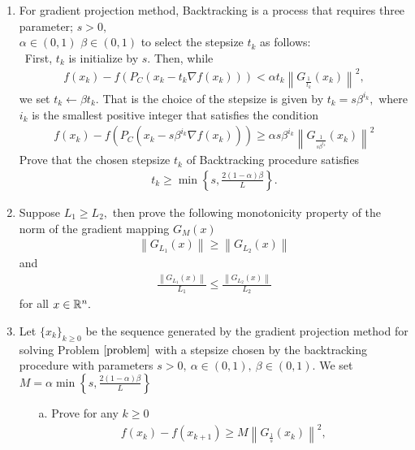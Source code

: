 \documentclass{ExerciseSheet}
\begin{document}
\begin{problem}
\begin{enumerate}
        \item For gradient projection method, Backtracking is a process that requires three parameter; $s>0,$\\ $\alpha\in(0,1)$
        $\beta\in(0,1)$ to select the stepsize $t_k$ as follows:\\
        \ First, $t_k$ is initialize by $s.$ Then, while
            \begin{align*}
                f(x_k) - f\left(P_C(x_k -t_k\nabla f(x_k))\right) < \alpha t_k \left\| G_{\frac{1}{t_k}}(x_k)\right\|^2,
            \end{align*}
            we set $t_k\leftarrow \beta t_k.$ That is the choice of the stepsize is given by $t_k=s\beta^{i_k},$ where $i_k$ is the smallest positive integer that satisfies the condition
            \begin{align}\label{backtracking}
                f(x_k) - f\left(P_C(x_k -s\beta^{i_k}\nabla f(x_k))\right) \geq \alpha s\beta^{i_k}\left\| G_{\frac{1}{s\beta^{i_k}}}(x_k)\right\|^2
            \end{align}
    Prove that the chosen stepsize $t_k$ of Backtracking procedure satisfies
      \begin{align}\label{stepsize lower bound}
          t_k\geq \min\left\{s,\frac{2(1-\alpha)\beta}{L} \right\}.
      \end{align}
        \item Suppose $L_1\geq L_2,$ then prove the following monotonicity property of the norm of the gradient mapping $G_M(x)$
        \begin{align}\label{monoticity 1}
            \left\|G_{L_1}(x)\right\| \geq \left\|G_{L_2}(x)\right\|
        \end{align}
 and 
     \begin{align}\label{monoticity 2}
            \frac{\left\|G_{L_1}(x)\right\|}{L_1} \leq  \frac{\left\|G_{L_2}(x)\right\|}{L_2}
        \end{align}
 for all $x\in \mathbb{R}^n.$
     \item Let $\{x_k\}_{k\geq0}$ be the sequence generated by the gradient projection method for solving Problem $\eqref{problem}$ with a stepsize chosen by the backtracking procedure with parameters $s>0,~\alpha\in(0,1),~\beta\in(0,1).$ We set $M=\alpha\min\left\{s,\frac{2(1-\alpha)\beta}{L}\right\}$
     \begin{itemize}
         \item [a.]Prove for any $k\geq0$
            \begin{align}\label{decrease}
                f(x_k)-f(x_{k+1})\geq M\left\|G_{\frac{1}{s}}(x_k)\right\|^2, %
           \end{align}
       


\end{itemize}
\end{enumerate}
\end{problem}
\end{document}
